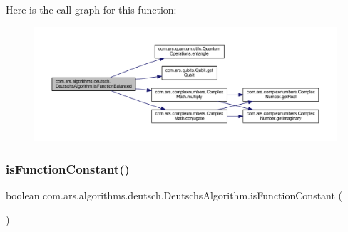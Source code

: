 Here is the call graph for this function\+:\nopagebreak
\begin{figure}[H]
\begin{center}
\leavevmode
\includegraphics[width=350pt]{classcom_1_1ars_1_1algorithms_1_1deutsch_1_1_deutschs_algorithm_ad0d426fd3aa5441adb8892d9ccbe9705_cgraph}
\end{center}
\end{figure}
\hypertarget{classcom_1_1ars_1_1algorithms_1_1deutsch_1_1_deutschs_algorithm_a853d89cbac22f31c9b0fd24e53c3930d}{}\label{classcom_1_1ars_1_1algorithms_1_1deutsch_1_1_deutschs_algorithm_a853d89cbac22f31c9b0fd24e53c3930d} 
\subsubsection{\texorpdfstring{is\+Function\+Constant()}{isFunctionConstant()}}
{\footnotesize\ttfamily boolean com.\+ars.\+algorithms.\+deutsch.\+Deutschs\+Algorithm.\+is\+Function\+Constant (\begin{DoxyParamCaption}{ }\end{DoxyParamCaption})}


